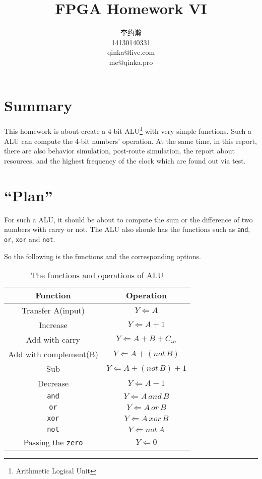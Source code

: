 \documentclass{article}
\title{FPGA Homework VI}
\author{李约瀚 \\ 14130140331 \\ qinka@live.com \\ me@qinka.pro}
\begin{document}
    \maketitle
    \newpage
    \tableofcontents
    \newpage
    
    \section{Summary}
    \label{sec:summary}
    
    This homework is about create a 4-bit ALU\footnote{Arithmetic Logical Unit} with very simple functions.
    Such a ALU can compute the 4-bit numbers' operation.
    At the same time, in this report, there are also behavior simulation, post-route simulation, the report about resources,
    and the highest frequency of the clock which are found out via test.
    
    \section{``Plan''}
    \label{sec:plan}
    
    For such a ALU, it should be about to compute the sum or the difference of two numbers with carry or not.
    The ALU also shoule has the functions such as \verb|and|, \verb|or|, \verb|xor| and \verb|not|.
    
    So the following is the functions and the corresponding options.
    
    \begin{table}[h!]
        \centering
        \begin{tabular}{|c|c|}
            \hline Function & Operation \\ 
            \hline Transfer A(input) & $Y \Leftarrow A$ \\ 
            \hline Increase & $ Y \Leftarrow A + 1$ \\ 
            \hline Add with carry & $Y \Leftarrow A + B + C_{in}$ \\ 
            \hline Add with complement(B)  & $Y \Leftarrow A + (not\,B)$ \\ 
            \hline Sub & $Y \Leftarrow A +(not\,B) + 1$ \\
            \hline Decrease & $ Y \Leftarrow A - 1$ \\
            \hline \verb|and| & $ Y \Leftarrow A\,and\,B $ \\
            \hline \verb|or|  & $ Y \Leftarrow A\,or\,B $ \\
            \hline \verb|xor| & $ Y \Leftarrow A\,xor\,B $ \\
            \hline \verb|not| & $ Y \Leftarrow not\,A$ \\
            \hline Passing the \verb|zero| & $ Y \Leftarrow 0 $\\
            \hline
        \end{tabular} 
        \caption{The functions and operations of ALU}
        \label{tab:alu:fno}
    \end{table}
    
\end{document}
